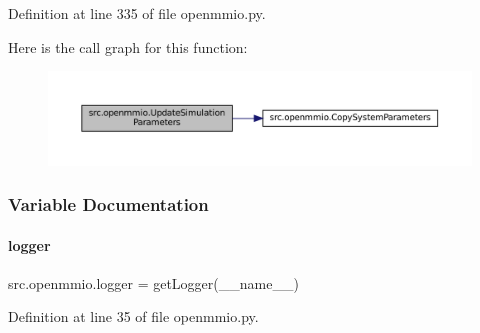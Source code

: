 Definition at line 335 of file openmmio.\+py.

Here is the call graph for this function\+:
\nopagebreak
\begin{figure}[H]
\begin{center}
\leavevmode
\includegraphics[width=350pt]{namespacesrc_1_1openmmio_adc5e020218883a8a87f7e1810d0a155e_cgraph}
\end{center}
\end{figure}


\subsubsection{Variable Documentation}
\mbox{\label{namespacesrc_1_1openmmio_a6247d5e13d27a3110aac12d4d325347a}} 
\paragraph{\texorpdfstring{logger}{logger}}
{\footnotesize\ttfamily src.\+openmmio.\+logger = get\+Logger(\+\_\+\+\_\+name\+\_\+\+\_\+)}



Definition at line 35 of file openmmio.\+py.

